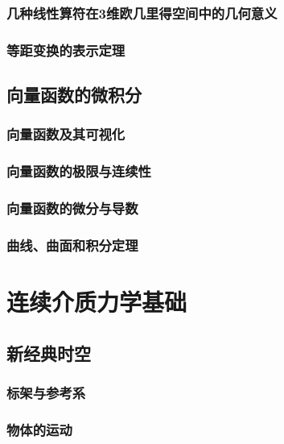 \documentclass[zihao=-4,linespread=1.5,a4paper,heading=true,twoside]{ctexbook}
\theoremstyle{definition}
\theoremstyle{plain}
\begin{document}
\section{几种线性算符在3维欧几里得空间中的几何意义}\label{sec:II.3.3}


\section{等距变换的表示定理}\label{sec:II.3.4}




\chapter{向量函数的微积分}\label{sec:II.4}
\section{向量函数及其可视化}\label{sec:II.4.1}


\section{向量函数的极限与连续性}\label{sec:II.4.2}


\section{向量函数的微分与导数}\label{sec:II.4.3}


\section{曲线、曲面和积分定理}\label{sec:II.4.4}


\part{连续介质力学基础}
\chapter{新经典时空}
\section{标架与参考系}


\section{物体的运动}

\end{document}
